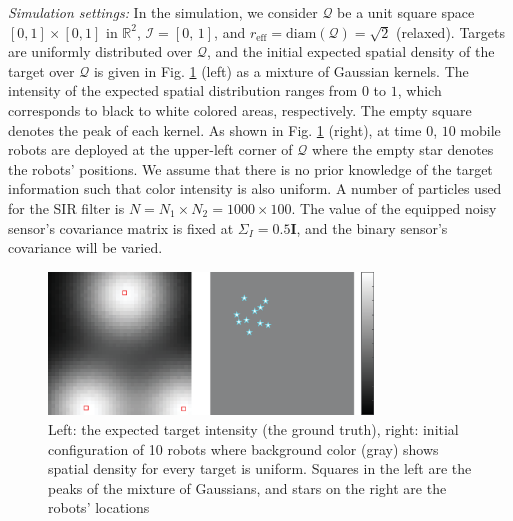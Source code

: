 \documentclass[journal]{IEEEtran}
\begin{document}
%


\textit{Simulation settings:}
In the simulation, we consider  $\mathcal{Q}$ be a unit square space $[0,1]\times [0,1]$ in $\mathbb{R}^2$, $\mathcal{I} = [0,\,1]$, and $r_{\text{eff}} = \text{diam}(\mathcal{Q})=\sqrt{2}$ (relaxed). 
Targets are uniformly distributed over $\mathcal{Q}$, and the initial expected spatial density of the target over $\mathcal{Q}$ is given in Fig. \ref{fig:fig1} (left) as a mixture of Gaussian kernels. The intensity of the expected spatial distribution ranges from $0$ to $1$, which corresponds to black to white colored areas, respectively. The empty square denotes the peak of each kernel.
As shown in Fig. \ref{fig:fig1} (right), at time $0$, $10$ mobile robots are deployed at the upper-left corner of $\mathcal{Q}$ where the empty star denotes the robots' positions. We assume that there is no prior knowledge of the target information such that color intensity is also uniform.
A number of particles used for the SIR filter is $N= N_1\times N_2 = 1000 \times 100$. The value of the equipped noisy sensor's covariance matrix is fixed at $\Sigma_I = 0.5\mathbf{I}$, and the binary sensor's covariance will be varied.
\begin{figure}
	\centering
	\includegraphics[width=3.4in]{figure/init_10_deploy}
	\caption{Left: the expected target intensity (the ground truth), right: initial configuration of 10 robots where background color (gray) shows spatial density for every target is uniform. Squares in the left are the peaks of the mixture of Gaussians, and stars on the right are the robots' locations} 
	\label{fig:fig1}
\end{figure}
\end{document}
